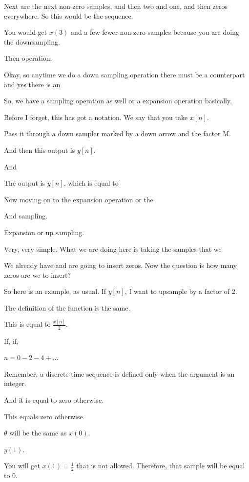 \documentclass[11pt,a4paper]{article}
\begin{document}
Next are the next non-zero samples, and then two and one, and then zeros everywhere. So this would be the sequence.

You would get $x(3)$ and a few fewer non-zero samples because you are doing the downsampling.

Then operation.

Okay, so anytime we do a down sampling operation there must be a counterpart and yes there is an

So, we have a sampling operation as well or a expansion operation basically.

Before I forget, this has got a notation. We say that you take $x[n]$.

Pass it through a down sampler marked by a down arrow and the factor M.

And then this output is $y[n]$.

And

The output is $y[n]$, which is equal to

Now moving on to the expansion operation or the

And sampling.

Expansion or up sampling.

Very, very simple. What we are doing here is taking the samples that we

We already have and are going to insert zeros. Now the question is how many zeros are we to insert?

So here is an example, as usual. If $y[n]$, I want to upsample by a factor of 2.

The definition of the function is the same.

This is equal to $\frac{x[n]}{2}$.

If, if,

$n = 0 - 2 - 4 + \ldots$

Remember, a discrete-time sequence is defined only when the argument is an integer.

And it is equal to zero otherwise.

This equals zero otherwise.

$\theta$ will be the same as $x(0)$.

$y(1)$.

You will get $x(1) = \frac{1}{2}$ that is not allowed. Therefore, that sample will be equal to 0.
\end{document}

